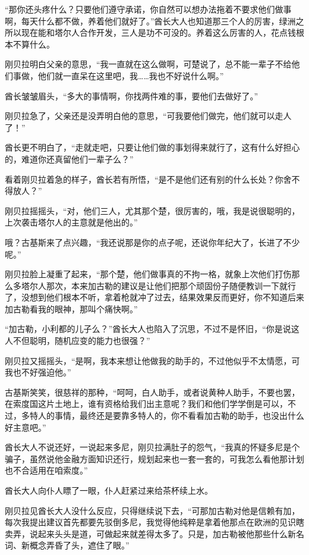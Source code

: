 “那你还头疼什么？只要他们遵守承诺，你自然可以想办法拖着不要求他们做事啊，每天什么都不做，养着他们就好了。”酋长大人也知道那三个人的厉害，绿洲之所以现在能和塔尔人合作开发，三人是功不可没的。养着这么厉害的人，花点钱根本不算什么。

刚贝拉明白父亲的意思，“我一直就在这么做啊，可楚说了，总不能一辈子不给他们事做，他们就一直呆在这里吧，我……我也不好说什么啊。”

酋长皱皱眉头，“多大的事情啊，你找两件难的事，要他们去做好了。”

刚贝拉急了，父亲还是没弄明白他的意思，“可我要他们做完，他们就可以走人了！”

酋长更不明白了，“走就走吧，只要让他们做的事划得来就行了，这有什么好担心的，难道你还真留他们一辈子么？”

看着刚贝拉着急的样子，酋长若有所悟，“是不是他们还有别的什么长处？你舍不得放人？”

刚贝拉摇摇头，“对，他们三人，尤其那个楚，很厉害的，哦，我是说很聪明的，上次袭击塔尔人的主意就是他出的。”

哦？古基斯来了点兴趣，“我还说那是你的点子呢，还说你年纪大了，长进了不少呢。”

刚贝拉脸上凝重了起来，“那个楚，他们做事真的不拘一格，就象上次他们打伤那么多塔尔人那次，本来加古勒的建议是让他们把那个顽固份子随便教训一下就行了，没想到他们根本不听，拿着枪就冲了过去，结果效果反而更好，你不知道后来加古勒看我的眼神，那叫个痛快啊。”

“加古勒，小利都的儿子么？”酋长大人也陷入了沉思，不过不是怀旧，“你是说这人不但聪明，随机应变的能力也很强？”

刚贝拉又摇摇头，“是啊，我本来想让他做我的助手的，不过他似乎不太情愿，可我也不好强迫他。”

古基斯笑笑，很慈祥的那种，“呵呵，白人助手，或者说黄种人助手，不要也罢，在索度国这片土地上，谁有资格给我们出主意呢？我们和他们学学倒是可以，不过，多特人的事情，最终还是要靠多特人的，你不看看加古勒的助手，也没出什么好主意吧。”

酋长大人不说还好，一说起来多尼，刚贝拉满肚子的怨气，“我真的怀疑多尼是个骗子，虽然说他金融方面知识还行，规划起来也一套一套的，可我怎么看他那计划也不合适用在咱索度。”

酋长大人向仆人瞟了一眼，仆人赶紧过来给茶杯续上水。

刚贝拉见酋长大人没什么反应，只得继续说下去，“可那加古勒对他是信赖有加，每次我提出建议首先都要先驳倒多尼，我觉得他纯粹是拿着他那点在欧洲的见识瞎卖弄，说起来头头是道，可做起来就差得太多了。只是，加古勒被他那些什么新名词、新概念弄昏了头，遮住了眼。”

